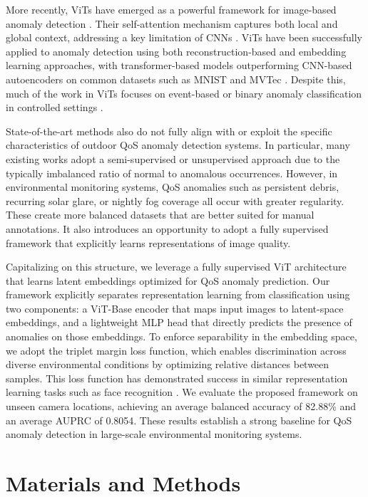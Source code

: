 \documentclass{article}
\begin{document}
More recently, \ac{ViT}s have emerged as a powerful framework for image-based anomaly detection \cite{mishra2021vt, yang2024unsupervised}. Their self-attention mechanism captures both local and global context, addressing a key limitation of \ac{CNNs} \cite{lee2022anovit}. \ac{ViT}s have been successfully applied to anomaly detection using both reconstruction-based and embedding learning approaches, with transformer-based models outperforming CNN-based autoencoders on common datasets such as MNIST and MVTec \cite{mishra2021vt}. Despite this, much of the work in \ac{ViT}s focuses on event-based or binary anomaly classification in controlled settings \cite{choi2022viv, yang2024unsupervised}. 

State-of-the-art methods also do not fully align with or exploit the specific characteristics of outdoor \ac{QoS} anomaly detection systems. In particular, many existing works adopt a semi-supervised or unsupervised approach due to the typically imbalanced ratio of normal to anomalous occurrences. However, in environmental monitoring systems, \ac{QoS} anomalies such as persistent debris, recurring solar glare, or nightly fog coverage all occur with greater regularity. These create more balanced datasets that are better suited for manual annotations. It also introduces an opportunity to adopt a fully supervised framework that explicitly learns representations of image quality. 

Capitalizing on this structure, we leverage a fully supervised \ac{ViT} architecture that learns latent embeddings optimized for \ac{QoS} anomaly prediction. Our framework explicitly separates representation learning from classification using two components: a \ac{ViT}-Base encoder that maps input images to latent-space embeddings, and a lightweight \ac{MLP} head that directly predicts the presence of anomalies on those embeddings. To enforce separability in the embedding space, we adopt the triplet margin loss function, which enables discrimination across diverse environmental conditions by optimizing relative distances between samples. This loss function has demonstrated success in similar representation learning tasks such as face recognition \cite{Schroff_2015_CVPR}. We evaluate the proposed framework on unseen camera locations, achieving an average balanced accuracy of 82.88\% and an average \ac{AUPRC} of 0.8054. These results establish a strong baseline for \ac{QoS} anomaly detection in large-scale environmental monitoring systems. 

\section{Materials and Methods}
\end{document}
